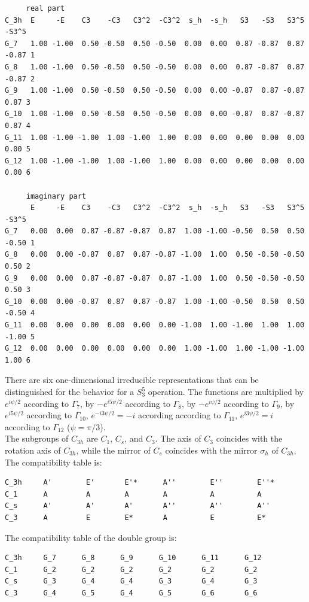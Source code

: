 \documentclass[12pt,a4paper]{article}
\begin{document}
\begin{verbatim}
     real part
C_3h  E     -E    C3    -C3   C3^2  -C3^2  s_h  -s_h   S3   -S3   S3^5 -S3^5
G_7   1.00 -1.00  0.50 -0.50  0.50 -0.50  0.00  0.00  0.87 -0.87  0.87 -0.87 1
G_8   1.00 -1.00  0.50 -0.50  0.50 -0.50  0.00  0.00  0.87 -0.87  0.87 -0.87 2
G_9   1.00 -1.00  0.50 -0.50  0.50 -0.50  0.00  0.00 -0.87  0.87 -0.87  0.87 3
G_10  1.00 -1.00  0.50 -0.50  0.50 -0.50  0.00  0.00 -0.87  0.87 -0.87  0.87 4
G_11  1.00 -1.00 -1.00  1.00 -1.00  1.00  0.00  0.00  0.00  0.00  0.00  0.00 5
G_12  1.00 -1.00 -1.00  1.00 -1.00  1.00  0.00  0.00  0.00  0.00  0.00  0.00 6

     imaginary part
      E     -E    C3    -C3   C3^2  -C3^2  s_h  -s_h   S3   -S3   S3^5 -S3^5
G_7   0.00  0.00  0.87 -0.87 -0.87  0.87  1.00 -1.00 -0.50  0.50  0.50 -0.50 1
G_8   0.00  0.00 -0.87  0.87  0.87 -0.87 -1.00  1.00  0.50 -0.50 -0.50  0.50 2
G_9   0.00  0.00  0.87 -0.87 -0.87  0.87 -1.00  1.00  0.50 -0.50 -0.50  0.50 3
G_10  0.00  0.00 -0.87  0.87  0.87 -0.87  1.00 -1.00 -0.50  0.50  0.50 -0.50 4
G_11  0.00  0.00  0.00  0.00  0.00  0.00 -1.00  1.00 -1.00  1.00  1.00 -1.00 5
G_12  0.00  0.00  0.00  0.00  0.00  0.00  1.00 -1.00  1.00 -1.00 -1.00  1.00 6
\end{verbatim}
There are six one-dimensional irreducible representations that can be
distinguished for the behavior for a $S_3^5$ operation. The functions
are multiplied by $e^{i\psi/2}$ according to $\Gamma_7$, by $-e^{i5\psi/2}$
according to $\Gamma_8$, by $-e^{i\psi/2}$ according to $\Gamma_9$,
by $e^{i5\psi/2}$ according to $\Gamma_{10}$, $e^{-i3\psi/2}=-i$ according
according to $\Gamma_{11}$, $e^{i3\psi/2}=i$ according to $\Gamma_{12}$
($\psi=\pi/3$).\\
The subgroups of $C_{3h}$ are $C_1$, $C_s$, and $C_3$. The axis of $C_3$
coincides with the rotation axis of $C_{3h}$, while the mirror of $C_s$ coincides
with the mirror $\sigma_h$ of $C_{3h}$. \\ 
The compatibility table is:
\begin{verbatim}
C_3h     A'        E'       E'*      A''        E''        E''* 
C_1      A         A        A        A          A          A
C_s      A'        A'       A'       A''        A''        A''
C_3      A         E        E*       A          E          E*
\end{verbatim}
The compatibility table of the double group is:
\begin{verbatim}
C_3h     G_7      G_8      G_9      G_10      G_11      G_12
C_1      G_2      G_2      G_2      G_2       G_2       G_2
C_s      G_3      G_4      G_4      G_3       G_4       G_3
C_3      G_4      G_5      G_4      G_5       G_6       G_6
\end{verbatim}
\end{document}
